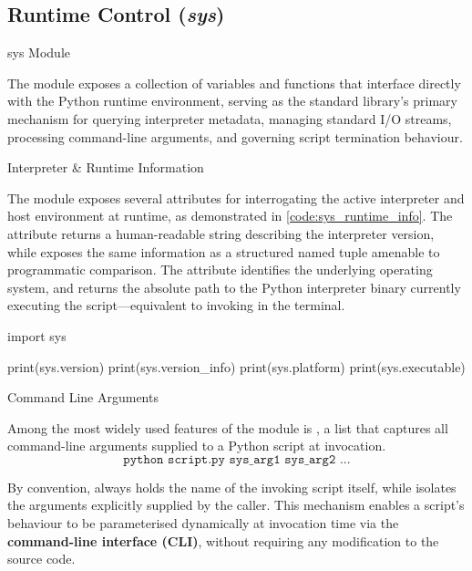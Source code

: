 \documentclass[10pt]{article}
\begin{document}
  \subsection{Runtime Control (\textit{sys})}

    \begin{core}{sys Module}

      The \href{https://docs.python.org/3/library/sys.html}{} module exposes a collection of variables and functions that interface directly with the Python runtime environment, serving as the standard library's primary mechanism for querying interpreter metadata, managing standard I/O streams, processing command-line arguments, and governing script termination behaviour.

    \end{core}

    \begin{core}{Interpreter \& Runtime Information}

      The  module exposes several attributes for interrogating the active interpreter and host environment at runtime, as demonstrated in \autoref{code:sys_runtime_info}. The  attribute returns a human-readable string describing the interpreter version, while  exposes the same information as a structured named tuple amenable to programmatic comparison. The  attribute identifies the underlying operating system, and  returns the absolute path to the Python interpreter binary currently executing the script---equivalent to invoking  in the terminal.

      \begin{pyconsole}

        import sys

        print(sys.version)
        print(sys.version_info)
        print(sys.platform)
        print(sys.executable)

      \end{pyconsole}

    \end{core}

    \begin{core}{Command Line Arguments}

      Among the most widely used features of the  module is , a list that captures all command-line arguments supplied to a Python script at invocation.
      \[
        \texttt{python script.py sys\_arg1 sys\_arg2 ...}
      \]

      By convention,  always holds the name of the invoking script itself, while  isolates the arguments explicitly supplied by the caller. This mechanism enables a script's behaviour to be parameterised dynamically at invocation time via the \textbf{command-line interface (CLI)}, without requiring any modification to the source code.

    \end{core}
\end{document}
